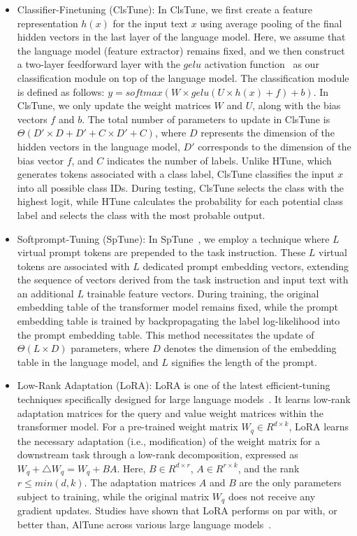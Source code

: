 \documentclass[11pt]{article}
\begin{document}
\begin{itemize}
    \item Classifier-Finetuning (ClsTune): In ClsTune, we first create a feature representation $h(x)$ for the input text $x$ using average pooling of the final hidden vectors in the last layer of the language model. Here, we assume that the language model (feature extractor) remains fixed, and we then construct a two-layer feedforward layer with the $gelu$ activation function~\cite{DBLP:journals/corr/HendrycksG16} as our classification module on top of the language model. The classification module is defined as follows: $y = softmax(W \times gelu(U \times h(x) + f) + b)$. In ClsTune, we only update the weight matrices $W$ and $U$, along with the bias vectors $f$ and $b$. The total number of parameters to update in ClsTune is $\Theta(D' \times D + D' + C \times D' + C)$, where $D$ represents the dimension of the hidden vectors in the language model, $D'$ corresponds to the dimension of the bias vector $f$, and $C$ indicates the number of labels. Unlike HTune, which generates tokens associated with a class label, ClsTune classifies the input $x$ into all possible class IDs. During testing, ClsTune selects the class with the highest logit, while HTune calculates the probability for each potential class label and selects the class with the most probable output.

    \item Softprompt-Tuning (SpTune): In SpTune~\cite{lester-etal-2021-power}, we employ a technique where $L$ virtual prompt tokens are prepended to the task instruction. These $L$ virtual tokens are associated with $L$ dedicated prompt embedding vectors, extending the sequence of vectors derived from the task instruction and input text with an additional $L$ trainable feature vectors. During training, the original embedding table of the transformer model remains fixed, while the prompt embedding table is trained by backpropagating the label log-likelihood into the prompt embedding table. This method necessitates the update of $\Theta(L \times D)$ parameters, where $D$ denotes the dimension of the embedding table in the language model, and $L$ signifies the length of the prompt.

    \item Low-Rank Adaptation (LoRA): LoRA is one of the latest efficient-tuning techniques specifically designed for large language models~\cite{DBLP:journals/corr/abs-2106-09685}. It learns low-rank adaptation matrices for the query and value weight matrices within the transformer model. For a pre-trained weight matrix $W_q \in R^{d \times k}$, LoRA learns the necessary adaptation (i.e., modification) of the weight matrix for a downstream task through a low-rank decomposition, expressed as $W_q + \triangle W_q = W_q + BA$. Here, $B \in R^{d \times r}$, $A \in R^{r \times k}$, and the rank $r \le min(d, k)$. The adaptation matrices $A$ and $B$ are the only parameters subject to training, while the original matrix $W_q$ does not receive any gradient updates. Studies have shown that LoRA performs on par with, or better than, AlTune across various large language models~\cite{DBLP:journals/corr/abs-2106-09685}.

\end{itemize}
\end{document}
